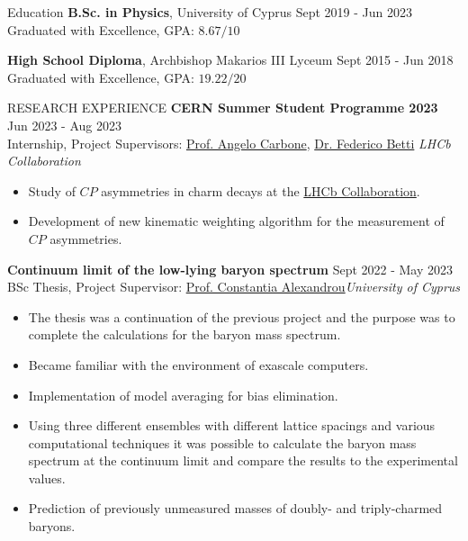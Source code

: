 \documentclass{resume} %
\begin{document}
\begin{rSection}{Education}
{\bf B.Sc. in Physics}, University of Cyprus \hfill {Sept 2019 - Jun 2023}\\
Graduated with Excellence, GPA: $8.67/10$

{\bf High School Diploma}, Archbishop Makarios III Lyceum \hfill {Sept 2015 - Jun 2018}\\
Graduated with Excellence, GPA: $19.22/20$
\end{rSection}

\bigbreak

\begin{rSection}{RESEARCH EXPERIENCE}
\textbf{CERN Summer Student Programme 2023} \hfill Jun 2023 - Aug 2023\\
Internship, Project Supervisors: \href{https://www.unibo.it/sitoweb/angelo.carbone/en}{Prof. Angelo Carbone}, \href{https://www.ph.ed.ac.uk/people/federico-betti}{Dr. Federico Betti}
\hfill \textit{LHCb Collaboration}
\begin{itemize}
\itemsep -3pt {}
\item Study of $CP$ asymmetries in charm decays at the \href{https://lhcb.web.cern.ch/}{LHCb Collaboration}.
\item Development of new kinematic weighting algorithm for the measurement of $CP$ asymmetries.
\end{itemize}

\textbf{Continuum limit of the low-lying baryon spectrum} \hfill Sept 2022 - May 2023\\
BSc Thesis, Project Supervisor:  \href{https://www.cyi.ac.cy/index.php/castorc/about-the-center/castorc-our-people/itemlist/user/99-constantia-alexandrou.html}{Prof. Constantia Alexandrou}\hfill \textit{University of Cyprus}
\begin{itemize}
\itemsep -3pt {} 
\item The thesis was a continuation of the previous project and the purpose was to complete the calculations for the baryon mass spectrum.
\item Became familiar with the environment of exascale computers.
\item Implementation of model averaging for bias elimination.
\item Using three different ensembles with different lattice spacings and various computational techniques it was possible to calculate the baryon mass spectrum at the continuum limit and compare the results to the experimental values.
\item Prediction of previously unmeasured masses of doubly- and triply-charmed baryons.
\end{itemize}


\end{rSection}
\end{document}
